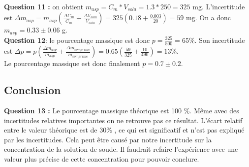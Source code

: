 \documentclass[12pt]{article}
\begin{document}
\textbf{Question 11 :} on obtient $ m_{asp}=C_m * V_{sola}=
1.3*250=325$ mg. L'incertitude est $\Delta m_{asp}=m_{asp}(\frac{\Delta C_m}{C_m}+ \frac{\Delta V_{sola}}{V_{sola}})=325(0.18+\frac{0.003}{20})=59$ mg. On a donc $m_{asp}=0.33\pm 0.06$ g. \\
\textbf{Question 12}: le pourcentage massique est donc $p=\frac{325}{500}= 65\%$. Son incertitude est $\Delta p= p(\frac{\Delta m_{asp}}{m_{asp}}+ \frac{\Delta m_{comprime}}{m_{comprime}})=0.65(\frac{59}{325}+\frac{10}{490})=13\%$. \\
Le pourcentage massique est donc finalement $p=0.7\pm 0.2$.
	
	\subsection{Conclusion}
\textbf{Question 13 :} Le pourcentage massique théorique est 100 \%. Même avec des incertitudes relatives importantes  on ne retrouve pas ce résultat. L'écart relatif entre le valeur théorique est de 30\% , ce qui est significatif et n'est pas expliqué par les incertitudes. Cela peut être causé par notre incertitude sur la concentration de la solution de soude. Il faudrait refaire l'expérience avec une valeur plus précise de cette concentration pour pouvoir conclure. 
\end{document}
